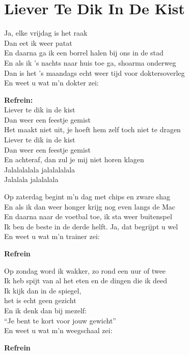 \section{Liever Te Dik In De Kist}
Ja, elke vrijdag is het raak\\
Dan eet ik weer patat\\
En daarna ga ik een borrel halen bij ons in de stad\\
En als ik ’s nachts naar huis toe ga, shoarma onderweg\\
Dan is het ’s maandags echt weer tijd voor doktersoverleg\\
En weet u wat m’n dokter zei:

\textbf{Refrein:}\\
Liever te dik in de kist\\
Dan weer een feestje gemist\\
Het maakt niet uit, je hoeft hem zelf toch
niet te dragen\\
Liever te dik in de kist\\
Dan weer een feestje gemist\\
En achteraf, dan zul je mij niet horen klagen\\
Jalalalalala jalalalalala\\
Jalalala jalalalala

Op zaterdag begint m’n dag met chips en zware shag\\
En als ik dan weer honger krijg nog even langs de Mac\\
En daarna naar de voetbal toe, ik sta weer buitenspel\\
Ik ben de beste in de derde helft. Ja, dat begrijpt u wel\\
En weet u wat m’n trainer zei:

\textbf{Refrein}

Op zondag word ik wakker, zo rond een uur of twee\\
Ik heb spijt van al het eten en de dingen die ik deed\\
Ik kijk dan in de spiegel,\\
het is echt geen gezicht\\
En ik denk dan bij mezelf:\\
“Je bent te kort voor jouw gewicht”\\
En weet u wat m’n weegschaal zei:

\textbf{Refrein}
